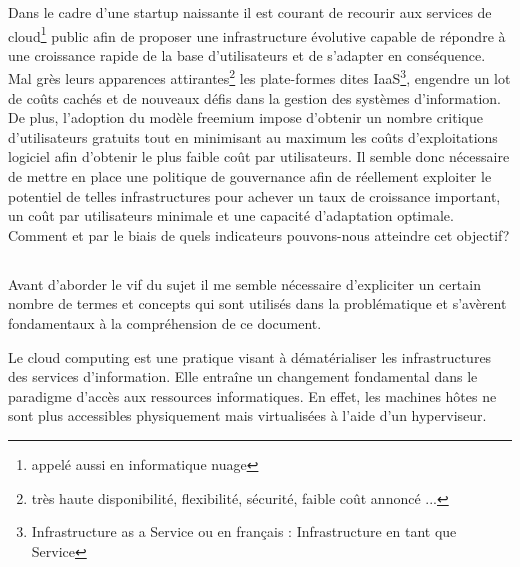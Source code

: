 \documentclass[11pt, a4paper ]{article}
\begin{document}
\begin{spacing}{1.5}


Dans le cadre d'une startup naissante il est courant de recourir aux services de cloud\footnote{appelé aussi en informatique nuage} public afin de proposer une infrastructure évolutive capable de répondre à une croissance rapide de la base d'utilisateurs et de s'adapter en conséquence.
Mal grès leurs apparences attirantes\footnote{très haute disponibilité, flexibilité, sécurité, faible coût annoncé ...} les plate-formes dites IaaS\footnote{Infrastructure as a Service ou en français : Infrastructure en tant que Service}, engendre un lot de coûts cachés et de nouveaux défis dans la gestion des systèmes d'information.
De plus, l'adoption du modèle freemium impose d'obtenir un nombre critique d'utilisateurs gratuits tout en minimisant au maximum les coûts d'exploitations logiciel afin d'obtenir le plus faible coût par utilisateurs.
Il semble donc nécessaire de mettre en place une politique de gouvernance afin de réellement exploiter le potentiel de telles infrastructures pour achever un taux de croissance important, un coût par utilisateurs minimale et une capacité d'adaptation optimale. Comment et par le biais de quels indicateurs pouvons-nous atteindre cet objectif?


			\subsection*{}

Avant d'aborder le vif du sujet il me semble nécessaire d'expliciter un certain nombre de termes et concepts qui sont utilisés dans la problématique et s'avèrent fondamentaux à la compréhension de ce document.

Le cloud computing\cite{cloudDef} est une pratique visant à dématérialiser les infrastructures des services d'information. Elle entraîne un changement fondamental dans le paradigme d'accès aux ressources informatiques. En effet, les machines hôtes ne sont plus accessibles physiquement mais virtualisées à l'aide d'un hyperviseur.


\end{spacing}
\end{document}
